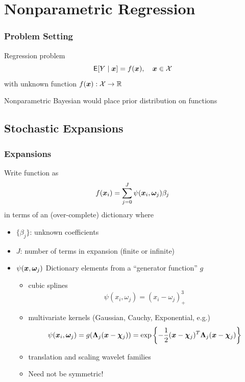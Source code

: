 \documentclass[]{beamer}
\newcommand{\bs}[2]{\begin{frame} \frametitle{#1}
{#2}
\end{frame} }
\begin{document}
\section{Nonparametric Regression}

\bs{Problem Setting}{
Regression problem
$$ {\sf{E}}[Y \mid \bm x] = f(\bm x), \quad \bm x \in \mathcal{X}$$
with unknown function $f(\bm x): \mathcal{X} \to \mathbb{R}$ \pause


\vspace{.5in}
Nonparametric Bayesian would place  prior distribution on functions


}

\subsection{Stochastic Expansions}
\bs{Expansions} {

Write function as
 $$f(\bm x_i) = \sum_{j=0}^{J}  \psi(\bm x_i, \bm \omega_j)\beta_j$$ in
terms of an (over-complete) dictionary where \pause

  \begin{itemize}
   \item  $\{\beta_j\}$:  unknown coefficients \pause
   \item  $J$: number of terms in expansion (finite or infinite) \pause


 \item $\psi(\bm x,\bm \omega_j)$   Dictionary elements from
a ``generator function'' $g$ \pause
  \begin{itemize}
  \item cubic splines
$$   \psi(x_i, \omega_j) =  (x_i - \omega_j)^3_+$$ \pause
  \item multivariate kernels  (Gaussian, Cauchy, Exponential, e.g.)
$$  \psi(\bm x_i, \bm \omega_j) =  g(
\bm \Lambda_j (\bm x - \bm \chi_j)) = \exp\left\{-\frac{1}{2}(\bm x - \bm \chi_j)^T \bm \Lambda_j (\bm x -
  \bm \chi_j)\right\}$$  \pause
  \item translation and scaling wavelet families  \pause

\item Need not be symmetric!
  \end{itemize}
  \end{itemize}


}
\end{document}
